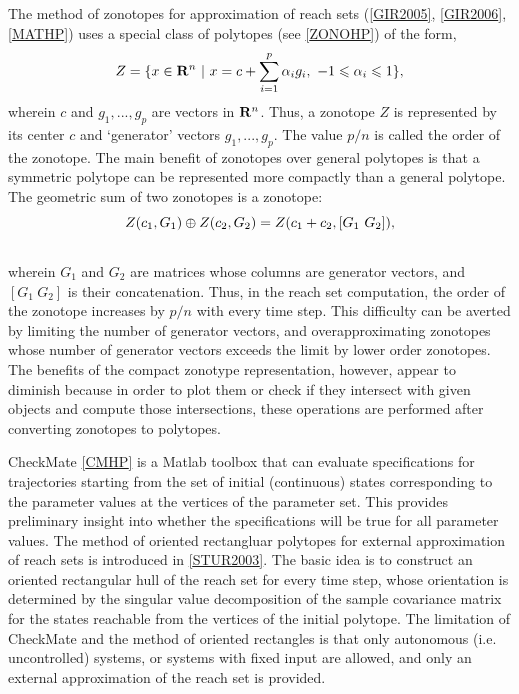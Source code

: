 \documentclass[letterpaper,10pt,english]{sphinxmanual}
\begin{document}
The method of zonotopes for approximation of reach sets ({\hyperref[chap_intro:gir2005]{{[}GIR2005{]}}}, {\hyperref[chap_intro:gir2006]{{[}GIR2006{]}}}, {\hyperref[chap_intro:mathp]{{[}MATHP{]}}})
uses a special class of polytopes (see {\hyperref[chap_intro:zonohp]{{[}ZONOHP{]}}})
of the form,
\begin{gather}
\begin{split}Z=\{x \in {\bf R}^n ~|~
x=c+\sum_{i=1}^p\alpha_ig_i,~ -1\leqslant\alpha_i\leqslant1\},\end{split}\notag
\end{gather}
wherein $c$ and $g_1, ..., g_p$ are vectors in
${\bf R}^n$. Thus, a zonotope $Z$ is represented by its
center $c$ and ‘generator’ vectors $g_1, ..., g_p$. The
value $p/n$ is called the order of the zonotope. The main benefit
of zonotopes over general polytopes is that a symmetric polytope can be
represented more compactly than a general polytope. The geometric sum of
two zonotopes is a zonotope:
\begin{gather}
\begin{split}Z(c_1, G_1)\oplus Z(c_2, G_2) = Z(c_1+c_2, [G_1 ~ G_2]),\end{split}\notag\\\begin{split}\end{split}\notag
\end{gather}
wherein $G_1$ and $G_2$ are matrices whose columns are
generator vectors, and $[G_1 ~ G_2]$ is their concatenation. Thus,
in the reach set computation, the order of the zonotope increases by
$p/n$ with every time step. This difficulty can be averted by
limiting the number of generator vectors, and overapproximating
zonotopes whose number of generator vectors exceeds the limit by lower
order zonotopes. The benefits of the compact zonotype representation,
however, appear to diminish because in order to plot them or check if
they intersect with given objects and compute those intersections, these
operations are performed after converting zonotopes to polytopes.

CheckMate {\hyperref[chap_intro:cmhp]{{[}CMHP{]}}} is a Matlab toolbox that can evaluate
specifications for trajectories starting from the set of initial
(continuous) states corresponding to the parameter values at the
vertices of the parameter set. This provides preliminary insight into
whether the specifications will be true for all parameter values. The
method of oriented rectangluar polytopes for external approximation of
reach sets is introduced in {\hyperref[chap_intro:stur2003]{{[}STUR2003{]}}}. The basic idea
is to construct an oriented rectangular hull of the reach set for every
time step, whose orientation is determined by the singular value
decomposition of the sample covariance matrix for the states reachable
from the vertices of the initial polytope. The limitation of CheckMate
and the method of oriented rectangles is that only autonomous (i.e.
uncontrolled) systems, or systems with fixed input are allowed, and only
an external approximation of the reach set is provided.
\end{document}

